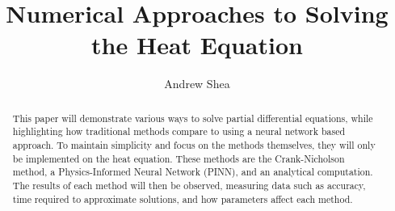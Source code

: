 \documentclass[12pt, reqno]{amsart}
\begin{document}
\title{Numerical Approaches to Solving the Heat Equation}
\author{Andrew Shea}

\renewcommand{\abstractname}{\textbf{Abstract}}
\begin{abstract}
This paper will demonstrate various ways to solve partial differential equations, while highlighting how traditional methods compare to using a neural network based approach. To maintain simplicity and focus on the methods themselves, they will only be implemented on the heat equation. These methods are the Crank-Nicholson method, a Physics-Informed Neural Network (PINN), and an analytical computation. The results of each method will then be observed, measuring data such as accuracy, time required to approximate solutions, and how parameters affect each method.
\end{abstract}
\maketitle


\doublespacing
\end{document}
